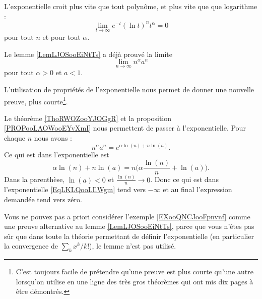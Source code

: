 \begin{lemma}
    L'exponentielle croit plus vite que tout polynôme, et plus vite que que logarithme :
    \begin{equation}        \label{EqExpDecrtPlusVite}
        \lim_{t\to\infty} e^{-t}(\ln t)^{n}t^{\alpha}=0
    \end{equation}
    pour tout $n$ et pour tout $\alpha$.
\end{lemma}

\begin{example}     \label{EXooQNCJooFpnvnf}
   Le lemme \ref{LemLJOSooEiNtTs} a déjà prouvé la limite 
    \begin{equation}
        \lim_{n\to \infty} n^{\alpha}a^n
    \end{equation}
    pour tout \( \alpha>0\) et \( a<1\).

    L'utilisation de propriétés de l'exponentielle nous permet de donner une nouvelle preuve, plus courte\footnote{C'est toujours facile de prétendre qu'une preuve est plus courte qu'une autre lorsqu'on utilise en une ligne des très gros théorèmes qui ont mis dix pages à être démontrés.}.

    Le théorème \ref{ThoRWOZooYJOGgR} et la proposition \ref{PROPooLAOWooEYvXmI} nous permettent de passer à l'exponentielle. Pour chaque \( n\) nous avons :
    \begin{equation}        \label{EqLKLQooLIlWgm}
        n^{\alpha}a^n= e^{\alpha\ln(n)+n\ln(a)}.
    \end{equation}
    Ce qui est dans l'exponentielle est
    \begin{equation}
        \alpha\ln(n)+n\ln(a)=n\big(\alpha \frac{ \ln(n) }{ n }+\ln(a) \big).
    \end{equation}
    Dans la parenthèse, \( \ln(a)<0\) et \( \frac{ \ln(n) }{ n }\to 0\). Donc ce qui est dans l'exponentielle \eqref{EqLKLQooLIlWgm} tend vers \( -\infty\) et au final l'expression demandée tend vers zéro.
\end{example}

\begin{remark}
    Vous ne pouvez pas a priori considérer l'exemple \ref{EXooQNCJooFpnvnf} comme une preuve alternative au lemme \ref{LemLJOSooEiNtTs}, parce que vous n'êtes pas sûr que dans toute la théorie permettant de définir l'exponentielle (en particulier la convergence de \( \sum_kx^k/k!\)), le lemme n'est pas utilisé.
\end{remark}

